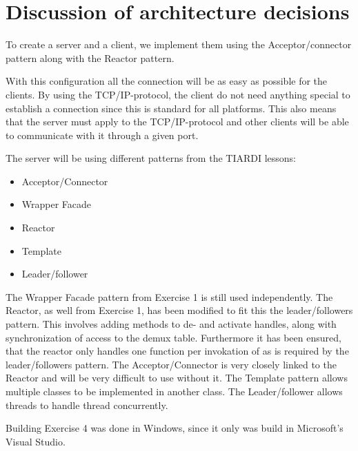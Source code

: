 \documentclass[Main]{subfiles}
\begin{document}
\section{Discussion of architecture decisions}

To create a server and a client, we implement them using the Acceptor/connector pattern along with the Reactor pattern.

With this configuration all the connection will be as easy as possible for the clients.
By using the TCP/IP-protocol, the client do not need anything special to establish a connection since this is standard for all platforms.
This also means that the server must apply to the TCP/IP-protocol and other clients will be able to communicate with it through a given port.

The server will be using different patterns from the TIARDI lessons:
\begin{itemize}
	\item Acceptor/Connector
	\item Wrapper Facade
	\item Reactor
	\item Template
	\item Leader/follower
\end{itemize}

The Wrapper Facade pattern from Exercise 1 is still used independently.
The Reactor, as well from Exercise 1, has been modified to fit this the leader/followers pattern. This involves adding methods to de- and activate handles, along with synchronization of access to the demux table. Furthermore it has been ensured, that the reactor only handles one function per invokation of  as is required by the leader/followers pattern.  
The Acceptor/Connector is very closely linked to the Reactor and will be very difficult to use without it.
The Template pattern allows multiple classes to be implemented in another class.
The Leader/follower allows threads to handle thread concurrently.

Building Exercise 4 was done in Windows, since it only was build in Microsoft's Visual Studio.	
\end{document}
